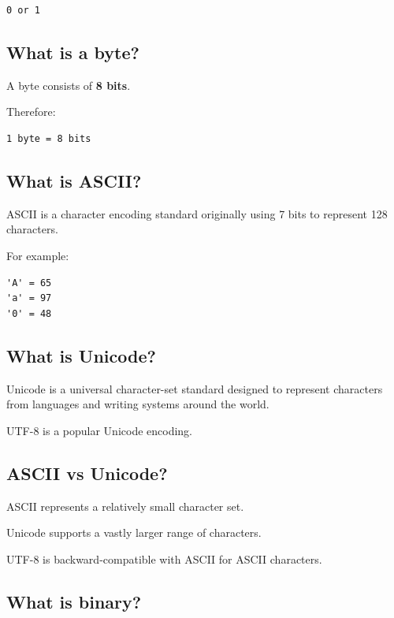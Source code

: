 \begin{lstlisting}
0 or 1
\end{lstlisting}

\medskip

\subsection{What is a byte?}

A byte consists of \textbf{8 bits}.

Therefore:

\begin{lstlisting}
1 byte = 8 bits
\end{lstlisting}

\medskip

\subsection{What is ASCII?}

ASCII is a character encoding standard originally using 7 bits to represent 128 characters.

For example:

\begin{lstlisting}
'A' = 65
'a' = 97
'0' = 48
\end{lstlisting}

\medskip

\subsection{What is Unicode?}

Unicode is a universal character-set standard designed to represent characters from languages and writing systems around the world.

UTF-8 is a popular Unicode encoding.

\medskip

\subsection{ASCII vs Unicode?}

ASCII represents a relatively small character set.

Unicode supports a vastly larger range of characters.

UTF-8 is backward-compatible with ASCII for ASCII characters.

\medskip

\subsection{What is binary?}

